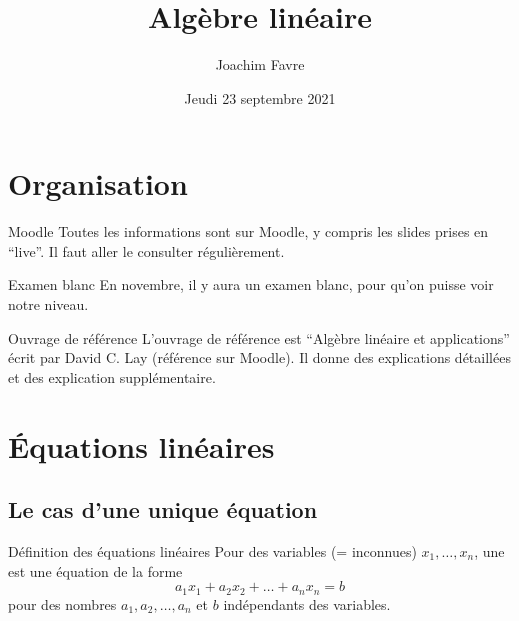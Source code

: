 \documentclass{article}
\title{Algèbre linéaire}
\author{Joachim Favre}
\date{Jeudi 23 septembre 2021}
\begin{document}
\maketitle


\section{Organisation}
\begin{parag}{Moodle}
    Toutes les informations sont sur Moodle, y compris les slides prises en ``live''. Il faut aller le consulter régulièrement.
\end{parag}

\begin{parag}{Examen blanc}
    En novembre, il y aura un examen blanc, pour qu'on puisse voir notre niveau.
\end{parag}

\begin{parag}{Ouvrage de référence}
    L'ouvrage de référence est ``Algèbre linéaire et applications'' écrit par David C. Lay (référence sur Moodle). Il donne des explications détaillées et des explication supplémentaire.
\end{parag}


\section{Équations linéaires}
\subsection{Le cas d'une unique équation}
\begin{parag}{Définition des équations linéaires}
    Pour des variables (= inconnues) $x_1, \ldots, x_n$, une  est une équation de la forme
    \[a_1 x_1 + a_2 x_2 + \ldots + a_n x_n = b\]
    pour des nombres $a_1, a_2, \ldots, a_n$ et $b$ indépendants des variables.
\end{parag}
\end{document}

